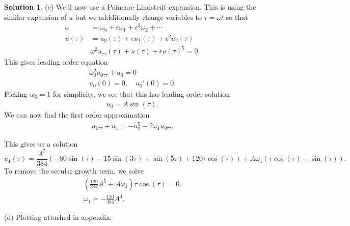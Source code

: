 \documentclass[12pt]{article}
\theoremstyle{definition}
\newtheorem{sol}{Solution}
\theoremstyle{remark}
\begin{document}
\begin{sol}
(c) We'll now use a Poincare-Lindstedt expansion. This is using the similar expansion of $u$ but we addditionally change variables to $\tau = \omega t$ so that
\begin{align*}
    \omega &= \omega_{0} + \epsilon \omega_{1} + \epsilon^{2}  \omega_{2} + \cdots\\
    u(\tau) &= u_{0}(\tau) + \epsilon u_{1}(\tau) + \epsilon^{2} u_{2}(\tau) \\
           &\omega^{2} u_{\tau \tau}(\tau) + u(\tau) + \epsilon u(\tau)^{5} = 0.
\end{align*}
This gives leading order equation
\begin{align*}
    \omega_{0}^{2} u_{0\tau \tau} + u_{0} = 0\\
    u_{0}(0) = 0, \quad u_{0}'(0)=0.
\end{align*}
Picking $w_{0} = 1$ for simplicity, we see that this has leading order solution
\begin{align*}
    u_{0} = A \sin(\tau).
\end{align*}
We can now find the first order approximation
\begin{align*}
   u_{1 \tau \tau } + u_{1} = - u_{0}^{5} -   2 \omega_{1} u_{0\tau \tau}.
\end{align*}

This gives us a solution
\begin{equation*}
    u_{1}(\tau) = \frac{A^{5}}{384}\left( - 80\sin(\tau) - 15 \sin(3\tau) + \sin(5\tau) + 120 \tau \cos(\tau) \right) + A \omega_{1} (\tau \cos(\tau) - \sin(\tau)).
\end{equation*}
To remove the secular growth term, we  solve
\begin{align*}
    \left( \frac{120}{384} A^{5} + A\omega_{1}\right) \tau \cos(\tau) = 0.\\
    \omega_{1} = -\frac{120}{384} A^{4}.
\end{align*}


(d) Plotting attached in appendix.

\end{sol}

\newpage
\end{document}
